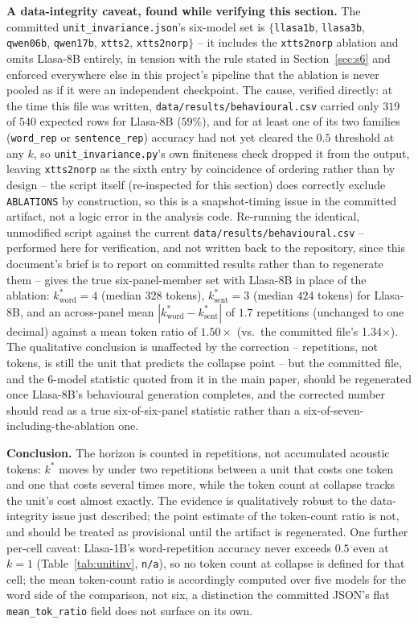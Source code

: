 \documentclass[11pt]{article}
\begin{document}
\textbf{A data-integrity caveat, found while verifying this section.} The
committed \texttt{unit\_invariance.json}'s six-model set is
$\{$\texttt{llasa1b}, \texttt{llasa3b}, \texttt{qwen06b}, \texttt{qwen17b},
\texttt{xtts2}, \texttt{xtts2norp}$\}$ -- it includes the \texttt{xtts2norp}
ablation and omits Llasa-8B entirely, in tension with the rule stated in
Section~\ref{sec:s6} and enforced everywhere else in this project's pipeline
that the ablation is never pooled as if it were an independent checkpoint. The
cause, verified directly: at the time this file was written,
\texttt{data/results/behavioural.csv} carried only $319$ of $540$ expected
rows for Llasa-8B ($59\%$), and for at least one of its two families
(\texttt{word\_rep} or \texttt{sentence\_rep}) accuracy had not yet cleared the
$0.5$ threshold at any $k$, so \texttt{unit\_invariance.py}'s own finiteness
check dropped it from the output, leaving \texttt{xtts2norp} as the sixth
entry by coincidence of ordering rather than by design -- the script itself
(re-inspected for this section) does correctly exclude \texttt{ABLATIONS} by
construction, so this is a snapshot-timing issue in the committed artifact,
not a logic error in the analysis code. Re-running the identical, unmodified
script against the current \texttt{data/results/behavioural.csv} -- performed
here for verification, and not written back to the repository, since this
document's brief is to report on committed results rather than to regenerate
them -- gives the true six-panel-member set with Llasa-8B in place of the
ablation: $k^\ast_{\mathrm{word}}{=}4$ (median $328$ tokens),
$k^\ast_{\mathrm{sent}}{=}3$ (median $424$ tokens) for Llasa-8B, and an
across-panel mean $|k^\ast_{\mathrm{word}}-k^\ast_{\mathrm{sent}}|$ of $1.7$
repetitions (unchanged to one decimal) against a mean token ratio of
$1.50\times$ (vs.\ the committed file's 1.34$\times$). The
qualitative conclusion is unaffected by the correction -- repetitions, not
tokens, is still the unit that predicts the collapse point -- but the
committed file, and the 6-model statistic quoted from it in the
main paper, should be regenerated once Llasa-8B's behavioural generation
completes, and the corrected number should read as a true six-of-six-panel
statistic rather than a six-of-seven-including-the-ablation one.

\textbf{Conclusion.} The horizon is counted in repetitions, not accumulated
acoustic tokens: $k^\ast$ moves by under two repetitions between a unit that
costs one token and one that costs several times more, while the token count
at collapse tracks the unit's cost almost exactly. The evidence is
qualitatively robust to the data-integrity issue just described; the point
estimate of the token-count ratio is not, and should be treated as
provisional until the artifact is regenerated. One further per-cell caveat:
Llasa-1B's word-repetition accuracy never exceeds $0.5$ even at $k{=}1$
(Table~\ref{tab:unitinv}, \texttt{n/a}), so no token count at collapse is
defined for that cell; the mean token-count ratio is accordingly computed over
five models for the word side of the comparison, not six, a distinction the
committed JSON's flat \texttt{mean\_tok\_ratio} field does not surface on its
own.
\end{document}
